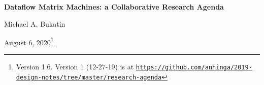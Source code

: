 \documentclass{article}
\begin{document}
\renewcommand{\abstractname}{\vspace{-\baselineskip}}

\renewcommand\contentsname{\vspace{-\baselineskip}}


\begin{center}

{\bf Dataflow Matrix Machines:  a Collaborative Research Agenda}
                                   



\vspace{0.1in}
Michael A. Bukatin


\vspace{0.085in}
August 6, 2020\footnote{Version 1.6. Version 1 (12-27-19) is at
\href{https://github.com/anhinga/2019-design-notes/tree/master/research-agenda}
{\tt https://github.com/anhinga/2019-design-notes/tree/master/research-agenda}}

\end{center}
\end{document}
